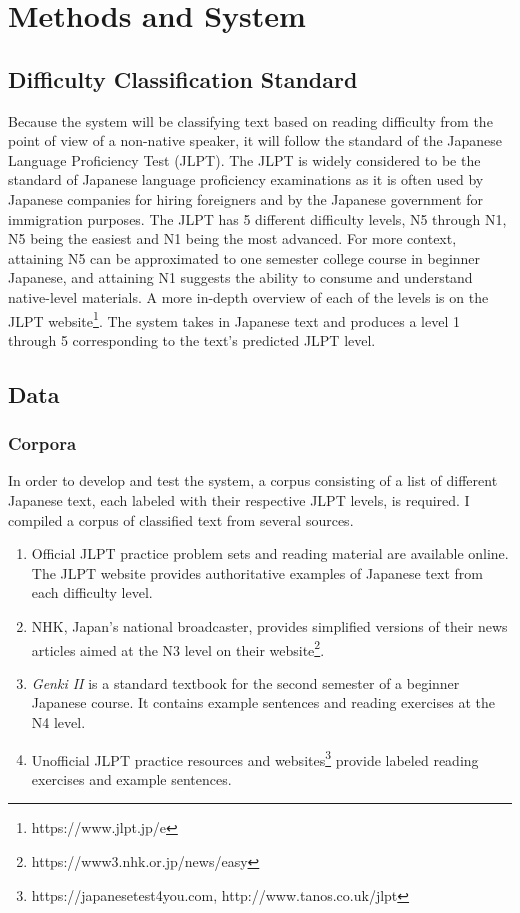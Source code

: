 \documentclass[12pt, a4paper]{article}
\begin{document}
\section{Methods and System}

\subsection{Difficulty Classification Standard}

Because the system will be classifying text based on reading difficulty from the point of view of a non-native speaker,
it will follow the standard of the Japanese Language Proficiency Test (JLPT). The JLPT is widely considered to be the standard 
of Japanese language proficiency examinations as it is often used by Japanese companies for hiring foreigners and by the Japanese government
for immigration purposes. The JLPT has 5 different difficulty levels, N5 through N1, N5 being the easiest and N1 being the most advanced.
For more context, attaining N5 can be approximated to one semester college course in beginner Japanese, and attaining N1 suggests the ability to
consume and understand native-level materials. A more in-depth overview of each of the levels is on the JLPT website\footnote[1]{https://www.jlpt.jp/e}.
The system takes in Japanese text and produces a level 1 through 5 corresponding to the text's predicted JLPT level.

\subsection{Data}

\subsubsection{Corpora}

In order to develop and test the system, a corpus consisting of a list of different Japanese text, each labeled with their
respective JLPT levels, is required. I compiled a corpus of classified text from several sources. 
\begin{enumerate}
    \item Official JLPT practice problem sets and reading material are available online. The JLPT website provides authoritative examples of Japanese text from 
    each difficulty level. 
    \item NHK, Japan's national broadcaster, provides simplified versions of their news articles aimed
    at the N3 level on their website\footnote[2]{https://www3.nhk.or.jp/news/easy}. 
    \item \textit{Genki II} \citep{Genki} is a standard textbook for the second semester of a beginner Japanese course. It contains 
    example sentences and reading exercises at the N4 level.
    \item Unofficial JLPT practice resources and websites\footnote[3]{https://japanesetest4you.com, http://www.tanos.co.uk/jlpt} provide labeled reading exercises and 
    example sentences.
\end{enumerate}
\end{document}
